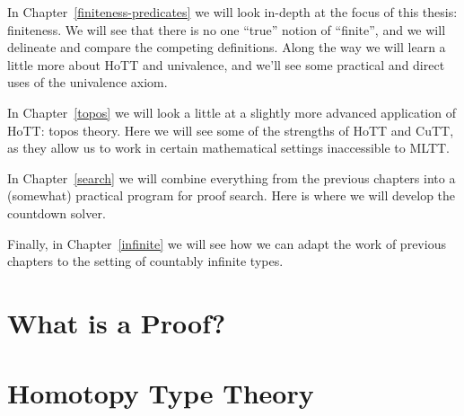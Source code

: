 In Chapter~\ref{finiteness-predicates} we will look in-depth at the focus of
this thesis: finiteness.
We will see that there is no one ``true'' notion of ``finite'', and we will
delineate and compare the competing definitions.
Along the way we will learn a little more about HoTT and univalence, and we'll
see some practical and direct uses of the univalence axiom.

In Chapter~\ref{topos} we will look a little at a slightly more advanced
application of HoTT: topos theory.
Here we will see some of the strengths of HoTT and CuTT, as they allow us to
work in certain mathematical settings inaccessible to MLTT.

In Chapter~\ref{search} we will combine everything from the previous chapters
into a (somewhat) practical program for proof search.
Here is where we will develop the countdown solver.

Finally, in Chapter~\ref{infinite} we will see how we can adapt the work of
previous chapters to the setting of countably infinite types.
\section{What is a Proof?}
\section{Homotopy Type Theory}




